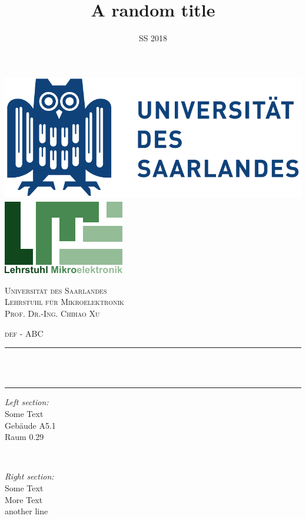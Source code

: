 
\title{A random title}
\date{SS 2018}	

\begin{titlepage}	
	\centering
    \vspace*{-2.0 cm}
    \includegraphics[scale = 0.5]{inc/img/title/uds.pdf}\hspace{10em}
	\includegraphics[scale = 1.25]{inc/img/title/lme.pdf}    
    \vfill
    \begin{singlespace}
    \textsc{\LARGE Universität des Saarlandes} \\ [0.5 cm]
    \textsc{\LARGE Lehrstuhl für Mikroelektronik} \\ [0.5 cm]
    \textsc{\LARGE Prof. Dr.-Ing. Chihao Xu} \\ [1 cm]
    \end{singlespace}
    \vfill
   	\textsc{\huge  def - ABC}
   	\vfill
	\rule{\linewidth}{0.2 mm} \\[0.3 cm]	
	\doublespacing{ \huge \textbf \thetitle }	\\
	\rule{\linewidth}{0.2 mm} 
	\vfill
	
\begin{onehalfspace}
	\begin{minipage}[t]{0.43\textwidth}
		\begin{flushleft}
			\emph{\large Left section:}\\[0.3em]
			Some Text \\
			Gebäude A5.1\\
			Raum 0.29\\
		\end{flushleft}
	\end{minipage}~			
	\begin{minipage}[t]{0.43\textwidth}
			
		\begin{flushright} 
			\emph{\large Right section:} \\[0.3em]
			Some Text \\
			More Text \\
			another line \\
		\end{flushright}
	\end{minipage}\vfill
\end{onehalfspace}

\end{titlepage}
